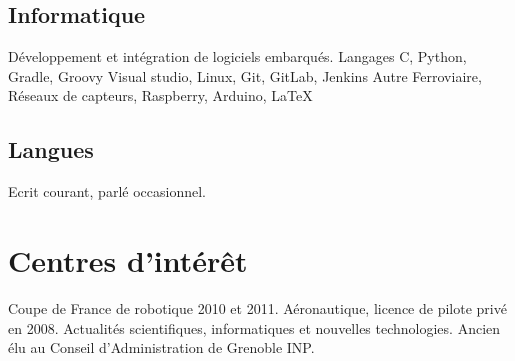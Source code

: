 \documentclass[10pt,a4paper]{moderncv}
\begin{document}
  \subsection{Informatique}

    {Développement et intégration de logiciels embarqués.\newline{}}
    {Langages}
    {C, Python, Gradle, Groovy}
    {Visual studio, Linux, Git, GitLab, Jenkins\newline{}}
    {Autre}
    {Ferroviaire, Réseaux de capteurs, Raspberry, Arduino, \LaTeX} 

  \subsection{Langues}

    {\small Ecrit courant, parlé occasionnel.\newline{}}

\section{Centres d'intérêt}
  {Coupe de France de robotique 2010 et 2011.\newline{}}
  {Aéronautique, licence de pilote privé en 2008.}
  \cvline{}
  {Actualités scientifiques, informatiques et nouvelles technologies.}
  \cvline{}
  {Ancien élu au Conseil d'Administration de Grenoble INP.}
\end{document}
